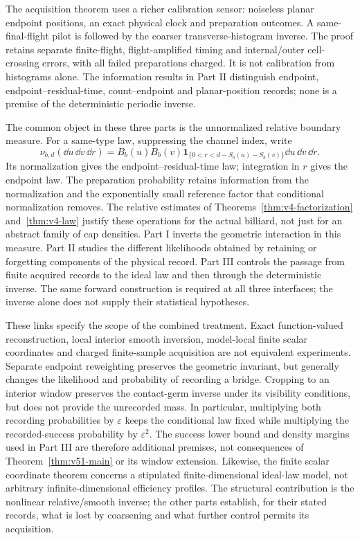 The acquisition theorem uses a richer calibration sensor: noiseless
planar endpoint positions, an exact physical clock and preparation
outcomes.  A same-final-flight pilot is followed by the coarser
transverse-histogram inverse.  The proof retains separate finite-flight,
flight-amplified timing and internal/outer cell-crossing errors, with all
failed preparations charged.  It is not calibration from histograms
alone.  The information results in Part II distinguish endpoint,
endpoint--residual-time, count--endpoint and planar-position records;
none is a premise of the deterministic periodic inverse.


The common object in these three parts is the unnormalized relative
boundary measure.  For a same-type law, suppressing the channel index,
write
\begin{equation}\label{eq:v52-common-measure}
 \nu_{b,d}(\dd u\,\dd v\,\dd r)
 =B_b(u)B_b(v)\mathbf1_{\{0<r<d-S_b(u)-S_b(v)\}}
                         \dd u\,\dd v\,\dd r.
\end{equation}
Its normalization gives the endpoint--residual-time law; integration
in $r$ gives the endpoint law.  The preparation probability retains
information from the normalization and the exponentially small reference
factor that conditional normalization removes.  The relative estimates
of Theorems~\ref{thm:v4-factorization} and~\ref{thm:v4-law} justify these
operations for the actual billiard, not just for an abstract family of
cap densities.  Part I inverts the geometric interaction in this measure.
Part II studies the different likelihoods obtained by retaining or
forgetting components of the physical record.  Part III controls the
passage from finite acquired records to the ideal law and then through
the deterministic inverse.  The same forward construction is required
at all three interfaces; the inverse alone does not supply their
statistical hypotheses.

These links specify the scope of the combined treatment.  Exact
function-valued reconstruction, local interior smooth inversion,
model-local finite scalar coordinates and charged finite-sample
acquisition are not equivalent experiments.  Separate endpoint
reweighting preserves the geometric invariant, but generally changes
the likelihood and probability of recording a bridge.  Cropping to an
interior window preserves the contact-germ inverse under its visibility
conditions, but does not provide the unrecorded mass.  In particular,
multiplying both recording probabilities by $\varepsilon$ keeps the
conditional law fixed while multiplying the recorded-success probability
by $\varepsilon^2$.  The success lower bound and density margins used
in Part III are therefore additional premises, not consequences of
Theorem~\ref{thm:v51-main} or its window extension.  Likewise, the finite
scalar coordinate theorem concerns a stipulated finite-dimensional
ideal-law model, not arbitrary infinite-dimensional efficiency profiles.
The structural contribution is the nonlinear relative/smooth inverse;
the other parts establish, for their stated records, what is lost by
coarsening and what further control permits its acquisition.

